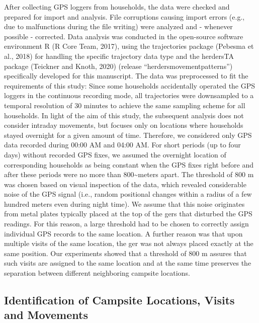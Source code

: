 \documentclass[]{elsarticle} %
\begin{document}
After collecting GPS loggers from households, the data were checked and
prepared for import and analysis. File corruptions causing import errors
(e.g., due to malfunctions during the file writing) were analyzed and -
whenever possible - corrected. Data analysis was conducted in the
open-source software environment R (R Core Team, 2017), using the
trajectories package (Pebesma et al., 2018) for handling the specific
trajectory data type and the herdersTA package (Teickner and Knoth,
2020) (release ``herdersmovementpatterns'') specifically developed for
this manuscript. The data was preprocessed to fit the requirements of
this study: Since some households accidentally operated the GPS loggers
in the continuous recording mode, all trajectories were downsampled to a
temporal resolution of 30 minutes to achieve the same sampling scheme
for all households. In light of the aim of this study, the subsequent
analysis does not consider intraday movements, but focuses only on
locations where households stayed overnight for a given amount of time.
Therefore, we considered only GPS data recorded during 00:00 AM and
04:00 AM. For short periods (up to four days) without recorded GPS
fixes, we assumed the overnight location of corresponding households as
being constant when the GPS fixes right before and after these periods
were no more than 800\textasciitilde meters apart. The threshold of 800
m was chosen based on visual inspection of the data, which revealed
considerable noise of the GPS signal (i.e., random positional changes
within a radius of a few hundred meters even during night time). We
assume that this noise originates from metal plates typically placed at
the top of the gers that disturbed the GPS readings. For this reason, a
large threshold had to be chosen to correctly assign individual GPS
records to the same location. A further reason was that upon multiple
visits of the same location, the ger was not always placed exactly at
the same position. Our experiments showed that a threshold of 800 m
assures that such visits are assigned to the same location and at the
same time preserves the separation between different neighboring
campsite locations.

\hypertarget{identification-of-campsite-locations-visits-and-movements}{%
\subsection{Identification of Campsite Locations, Visits and
Movements}\label{identification-of-campsite-locations-visits-and-movements}}
\end{document}
